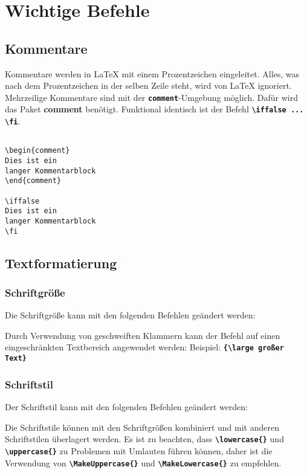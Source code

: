 \section{Wichtige Befehle}
\subsection{Kommentare}
Kommentare werden in \LaTeX{} mit einem Prozentzeichen eingeleitet. Alles, was nach dem Prozentzeichen in der selben Zeile steht, wird von \LaTeX{} ignoriert. Mehrzeilige Kommentare sind mit der \texttt{\textbf{comment}}-Umgebung möglich. Dafür wird das Paket \textbf{comment} benötigt. Funktional identisch ist der Befehl \textbf{\texttt{\textbackslash iffalse ... \textbackslash fi}}.

\begin{lstlisting}[language={[LaTeX]TeX}, basicstyle=\small\ttfamily]
% Dies ist ein einzeiliger Kommentar
    
\begin{comment}
Dies ist ein
langer Kommentarblock
\end{comment}

\iffalse
Dies ist ein
langer Kommentarblock
\fi
\end{lstlisting}

\subsection{Textformatierung}
\subsubsection{Schriftgröße}
Die Schriftgröße kann mit den folgenden Befehlen geändert werden:



Durch Verwendung von geschweiften Klammern kann der Befehl auf einen eingeschränkten Textbereich angewendet werden:
Beispiel: \textbf{\texttt{\{\textbackslash large großer Text\}}}

\newpage
\subsubsection{Schriftstil}
Der Schriftstil kann mit den folgenden Befehlen geändert werden:



Die Schriftstile können mit den Schriftgrößen kombiniert und mit anderen Schriftstilen überlagert werden.
Es ist zu beachten, dass \textbf{\texttt{\textbackslash lowercase\{\}}} und \textbf{\texttt{\textbackslash uppercase\{\}}} zu Problemen mit Umlauten führen können, daher ist die Verwendung von \textbf{\texttt{\textbackslash MakeUppercase\{\}}} und \textbf{\texttt{\textbackslash MakeLowercase\{\}}} zu empfehlen.


